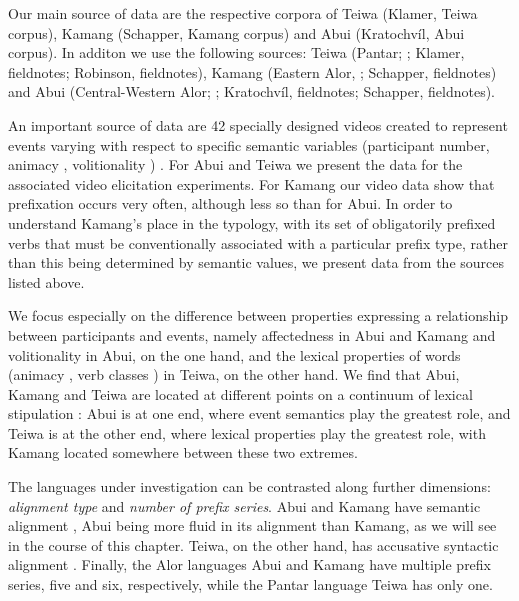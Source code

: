 Our main source of data are the respective corpora of Teiwa  (Klamer, Teiwa corpus), Kamang  (Schapper, Kamang corpus) and Abui  (Kratochv\'il, Abui corpus). In additon we use the following sources: Teiwa (Pantar; \citet{Klamer2010}; Klamer, fieldnotes; Robinson, fieldnotes), Kamang (Eastern Alor, \citet{SchapperEtAl2011}; Schapper, fieldnotes) and Abui (Central-Western Alor; \citet{Kratochvil2007,Kratochvil2011}; Kratochv\'il, fieldnotes; Schapper, fieldnotes).

An important source of data are 42 specially designed videos created to represent events varying with respect to specific semantic variables (participant number, animacy , volitionality ) \citep[see][]{FeddenEtAl2013}. For Abui and Teiwa we present the data for the associated video elicitation experiments. For Kamang  our video data show that prefixation occurs very often, although less so than for Abui. In order to understand Kamang's place in the typology, with its set of obligatorily prefixed verbs that must be conventionally associated with a particular prefix type, rather than this being determined by semantic values, we present data from the sources listed above.

We focus especially on the difference between properties expressing a relationship between participants and events, namely affectedness  in Abui  and Kamang  and volitionality  in Abui, on the one hand, and the lexical properties of words (animacy , verb classes ) in Teiwa, on the other hand. We find that Abui, Kamang and Teiwa are located at different points on a continuum of lexical stipulation : Abui is at one end, where event semantics play the greatest role, and Teiwa is at the other end, where lexical properties play the greatest role, with Kamang located somewhere between these two extremes.

The languages under investigation can be contrasted along further dimensions: \textit{alignment type} and \textit{number of prefix series}. Abui  and Kamang  have semantic alignment , Abui being more fluid in its alignment than Kamang, as we will see in the course of this chapter. Teiwa, on the other hand, has accusative syntactic alignment . Finally, the Alor languages Abui and Kamang have multiple prefix series, five and six, respectively, while the Pantar language Teiwa has only one.

